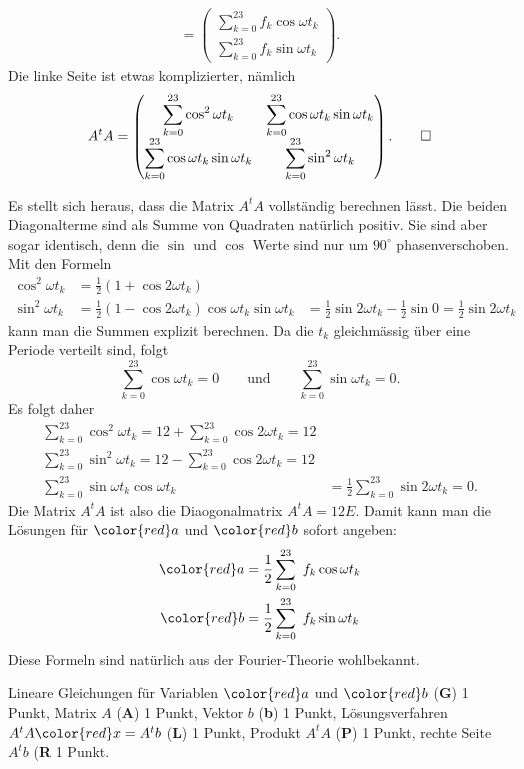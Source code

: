 \begin{loesung}
\begin{align*}
=
\begin{pmatrix}
\displaystyle\sum_{k=0}^{23} f_k\cos\omega t_k\\
\displaystyle\sum_{k=0}^{23} f_k\sin\omega t_k
\end{pmatrix}.
\end{align*}
Die linke Seite ist etwas komplizierter, nämlich
\[
A^tA
=
\begin{pmatrix}
\displaystyle \sum_{k=0}^{23} \cos^2\omega t_k
&
\displaystyle \sum_{k=0}^{23} \cos\omega t_k\sin\omega t_k
\\
\displaystyle \sum_{k=0}^{23} \cos\omega t_k\sin\omega t_k
&
\displaystyle \sum_{k=0}^{23} \sin^2\omega t_k
\end{pmatrix}.
\qedhere
\]
\end{loesung}

\begin{diskussion}
Es stellt sich heraus, dass die Matrix $A^tA$ vollständig berechnen lässt.
Die beiden Diagonalterme sind als Summe von Quadraten natürlich positiv.
Sie sind aber sogar identisch, denn die $\sin$ und $\cos$ Werte
sind nur um $90^\circ$ phasenverschoben.
Mit den Formeln
\begin{align*}
\cos^2\omega t_k
&=
\frac12(1+\cos2\omega t_k)
\\
\sin^2\omega t_k
&=
\frac12(1-\cos 2\omega t_k)
\cos\omega t_k \sin\omega t_k
&=
\frac12\sin2\omega t_k
-
\frac12\sin 0
=
\frac12\sin2\omega t_k
\end{align*}
kann man die Summen explizit berechnen.
Da die $t_k$ gleichmässig über eine Periode verteilt sind, folgt
\[
\sum_{k=0}^23 \cos\omega t_k = 0
\qquad\text{und}\qquad
\sum_{k=0}^23 \sin\omega t_k = 0.
\]
Es folgt daher
\begin{align*}
\sum_{k=0}^{23}
\cos^2\omega t_k
=
12 + \sum_{k=0}^{23}\cos2\omega t_k = 12
\\
\sum_{k=0}^{23}
\sin^2\omega t_k
=
12 - \sum_{k=0}^{23}\cos2\omega t_k = 12
\\
\sum_{k=0}^{23}
\sin\omega t_k\cos\omega t_k
&=
\frac12\sum_{k=0}^{23} \sin 2\omega t_k
= 0.
\end{align*}
Die Matrix $A^tA$ ist also die Diaogonalmatrix $A^tA=12E$.
Damit kann man die Lösungen für ${\color{red}a}$ und ${\color{red}b}$
sofort angeben:
\begin{align*}
{\color{red}a}
&= 
\frac12\sum_{k=0}^{23} f_k \cos\omega t_k
\\
{\color{red}b}
&= 
\frac12\sum_{k=0}^{23} f_k \sin\omega t_k
\end{align*}
Diese Formeln sind natürlich aus der Fourier-Theorie wohlbekannt.
\end{diskussion}

\begin{bewertung}
Lineare Gleichungen für Variablen ${\color{red}a}$ und ${\color{red}b}$
({\bf G}) 1 Punkt,
Matrix $A$ ({\bf A}) 1 Punkt,
Vektor $b$ ({\bf b}) 1 Punkt,
Lösungsverfahren $A^tA{\color{red}x} = A^tb$ ({\bf L}) 1 Punkt,
Produkt $A^tA$ ({\bf P}) 1 Punkt,
rechte Seite $A^tb$ ({\bf R} 1 Punkt.
\end{bewertung}





